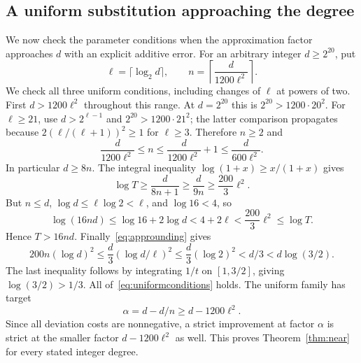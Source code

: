 \documentclass[manuscript,review,anonymous]{acmart}
\begin{document}
\subsection{A uniform substitution approaching the degree}\label{app:tail}
We now check the parameter conditions when the approximation factor approaches $d$ with an explicit additive error. For an arbitrary integer $d\ge2^{20}$, put
\begin{equation}\label{eq:appnearparams}
 \ell=\lceil\log_2d\rceil,\qquad
 n=\left\lceil\frac{d}{1200\ell^2}\right\rceil.
\end{equation}
We check all three uniform conditions, including changes of $\ell$ at powers of two.
First $d>1200\ell^2$ throughout this range. At $d=2^{20}$ this is $2^{20}>1200\cdot20^2$. For $\ell\ge21$, use $d>2^{\ell-1}$ and $2^{20}>1200\cdot21^2$; the latter comparison propagates because $2(\ell/(\ell+1))^2\ge1$ for $\ell\ge3$. Therefore $n\ge2$ and
\begin{equation}\label{eq:approunding}
 \frac{d}{1200\ell^2}\le n
 \le\frac{d}{1200\ell^2}+1
 \le\frac{d}{600\ell^2}.
\end{equation}
In particular $d\ge8n$. The integral inequality $\log(1+x)\ge x/(1+x)$ gives
\[
 \log T\ge\frac{d}{8n+1}\ge\frac{d}{9n}
 \ge\frac{200}{3}\ell^2.
\]
But $n\le d$, $\log d\le\ell\log2<\ell$, and $\log16<4$, so
\[
 \log(16nd)\le\log16+2\log d<4+2\ell
 <\frac{200}{3}\ell^2\le\log T.
\]
Hence $T>16nd$. Finally~\eqref{eq:approunding} gives
\[
 200n(\log d)^2
 \le\frac d3(\log d/\ell)^2
 \le\frac d3(\log2)^2
 <d/3<d\log(3/2).
\]
The last inequality follows by integrating $1/t$ on $[1,3/2]$, giving $\log(3/2)>1/3$. All of~\eqref{eq:uniformconditions} holds. The uniform family has target
\[
 \alpha=d-d/n\ge d-1200\ell^2.
\]
Since all deviation costs are nonnegative, a strict improvement at factor $\alpha$ is strict at the smaller factor $d-1200\ell^2$ as well. This proves Theorem~\ref{thm:near} for every stated integer degree.
\end{document}
